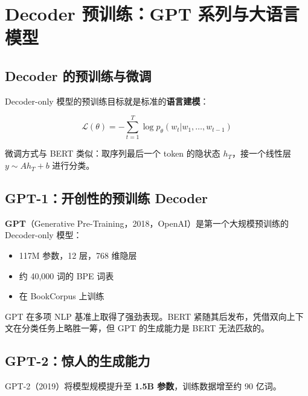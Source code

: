 \documentclass[a4paper]{article}
\begin{document}

\section{Decoder 预训练：GPT 系列与大语言模型}

\subsection{Decoder 的预训练与微调}

Decoder-only 模型的预训练目标就是标准的\textbf{语言建模}：

$$\mathcal{L}(\theta) = -\sum_{t=1}^{T} \log p_\theta(w_t | w_1, \ldots, w_{t-1})$$





微调方式与 BERT 类似：取序列最后一个 token 的隐状态 $h_T$，接一个线性层 $y \sim Ah_T + b$ 进行分类。

\subsection{GPT-1：开创性的预训练 Decoder}

\textbf{GPT}（Generative Pre-Training，2018，OpenAI）是第一个大规模预训练的 Decoder-only 模型：

\begin{itemize}
    \item 117M 参数，12 层，768 维隐层
    \item 约 40,000 词的 BPE 词表
    \item 在 BookCorpus 上训练
\end{itemize}





GPT 在多项 NLP 基准上取得了强劲表现。BERT 紧随其后发布，凭借双向上下文在分类任务上略胜一筹，但 GPT 的生成能力是 BERT 无法匹敌的。

\subsection{GPT-2：惊人的生成能力}

GPT-2（2019）将模型规模提升至 \textbf{1.5B 参数}，训练数据增至约 90 亿词。



\end{document}
